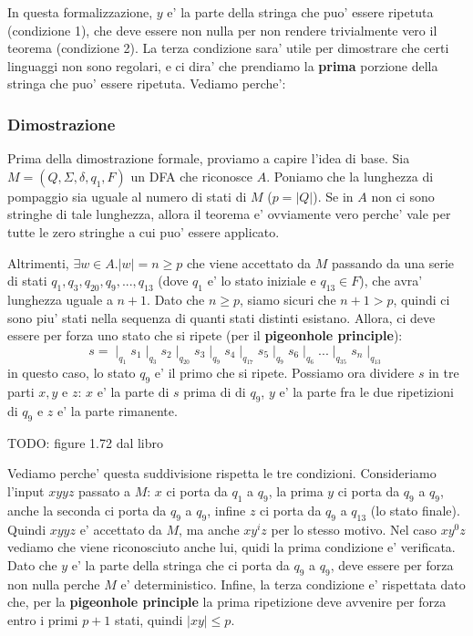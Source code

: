 In questa formalizzazione, $ y $ e' la parte della stringa che puo' essere ripetuta (condizione 1), che deve essere non nulla per non rendere trivialmente vero il teorema (condizione 2). La terza condizione sara' utile per dimostrare che certi linguaggi non sono regolari, e ci dira' che prendiamo la \textbf{prima} porzione della stringa che puo' essere ripetuta. Vediamo perche':

\subsubsection{Dimostrazione}
Prima della dimostrazione formale, proviamo a capire l'idea di base. Sia $ M = (Q, \Sigma, \delta, q_1, F) $ un DFA che riconosce $ A $. Poniamo che la lunghezza di pompaggio sia uguale al numero di stati di $ M $ ($ p = |Q| $). Se in $ A $ non ci sono stringhe di tale lunghezza, allora il teorema e' ovviamente vero perche' vale per tutte le zero stringhe a cui puo' essere applicato.

Altrimenti, $ \exists w \in A. |w| = n \geq p $ che viene accettato da $ M $ passando da una serie di stati $ q_1, q_3, q_{20}, q_9, ..., q_{13} $ (dove $ q_1 $ e' lo stato iniziale e $ q_{13} \in F $), che avra' lunghezza uguale a $ n+1 $. Dato che $ n \geq p $, siamo sicuri che $ n+1 > p $, quindi ci sono piu' stati nella sequenza di quanti stati distinti esistano. Allora, ci deve essere per forza uno stato che si ripete (per il \textbf{pigeonhole principle}):
\[
s = \mid_{q_1} s_1  \mid_{q_3} s_2 \mid_{q_{20}} s_3 \mid_{q_9} s_4 \mid_{q_{17}} s_5 \mid_{q_9} s_6 \mid_{q_6} ... \mid_{q_{35}} s_n \mid_{q_{13}}
\]
in questo caso, lo stato $ q_9 $ e' il primo che si ripete. Possiamo ora dividere $ s $ in tre parti $ x, y $ e $ z $: $ x $ e' la parte di $ s $ prima di di $ q_9 $, $ y $ e' la parte fra le due ripetizioni di $ q_9 $ e $ z $ e' la parte rimanente. 

TODO: figure 1.72 dal libro

Vediamo perche' questa suddivisione rispetta le tre condizioni. Consideriamo l'input $ xyyz $ passato a $ M $: $ x $ ci porta da $ q_1  $ a $ q_9 $, la prima $ y $ ci porta da $ q_9 $ a $ q_9 $, anche la seconda ci porta da $ q_9 $ a $ q_9 $, infine $ z $ ci porta da $ q_9 $ a $ q_{13} $ (lo stato finale). Quindi $ xyyz $ e' accettato da $ M $, ma anche $ xy^iz $ per lo stesso motivo. Nel caso $ xy^0z $ vediamo che viene riconosciuto anche lui, quidi la prima condizione e' verificata. Dato che $ y $ e' la parte della stringa che ci porta da $ q_9 $ a $ q_9 $, deve essere per forza non nulla perche $ M $ e' deterministico. Infine, la terza condizione e' rispettata dato che, per la \textbf{pigeonhole principle} la prima ripetizione deve avvenire per forza entro i primi $ p+1 $ stati, quindi $ |xy| \leq p $.

